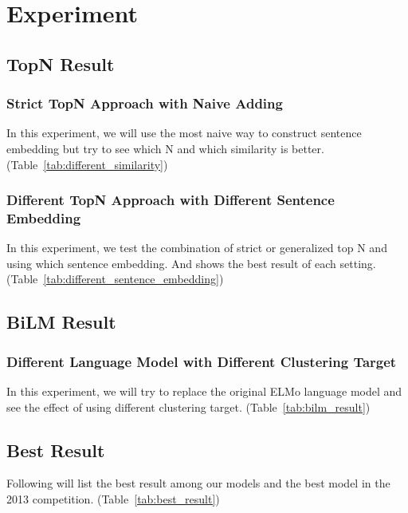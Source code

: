 \section{Experiment}
\label{sec:experiment}

\subsection*{TopN Result}

\subsubsection*{Strict TopN Approach with Naive Adding}

In this experiment, we will use the most naive way to construct sentence embedding but try to see which N and which similarity is better. (Table~\ref{tab:different_similarity})



\subsubsection*{Different TopN Approach with Different Sentence Embedding}

In this experiment, we test the combination of strict or generalized top N and using which sentence embedding. And shows the best result of each setting. (Table~\ref{tab:different_sentence_embedding})



\subsection*{BiLM Result}

\subsubsection*{Different Language Model with Different Clustering Target}

In this experiment, we will try to replace the original ELMo language model and see the effect of using different clustering target. (Table~\ref{tab:bilm_result})



\subsection*{Best Result}

Following will list the best result among our models and the best model in the 2013 competition. (Table~\ref{tab:best_result})


